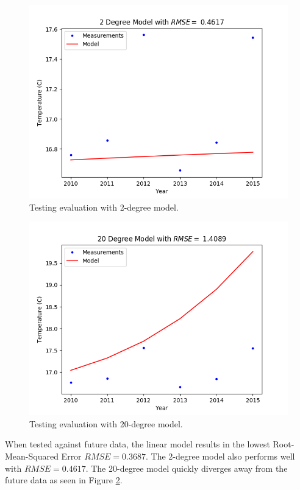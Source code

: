 \documentclass[letterpaper]{article}
\begin{document}
	\begin{figure}[h]
		\includegraphics[scale=0.625]{Figure_8_D2II_2degree}
		\centering
		\caption{Testing evaluation with 2-degree model.}
		\label{fig:2 degree testing}
	\end{figure}\begin{figure}[h]
		\includegraphics[scale=0.625]{Figure_9_D2II_20degree}
		\centering
		\caption{Testing evaluation with 20-degree model.}
		\label{fig:20 degree testing}
	\end{figure}
	When tested against future data, the linear model results in the lowest Root-Mean-Squared Error $RMSE = 0.3687$.
	The 2-degree model also performs well with $RMSE = 0.4617$. 
	The 20-degree model quickly diverges away from the future data as seen in Figure \ref{fig:20 degree testing}.
\end{document}
